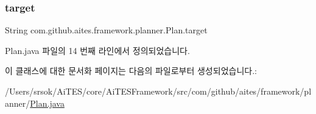 \subsubsection{\texorpdfstring{target}{target}}
{\footnotesize\ttfamily String com.\+github.\+aites.\+framework.\+planner.\+Plan.\+target\hspace{0.3cm}{\ttfamily [private]}}



Plan.\+java 파일의 14 번째 라인에서 정의되었습니다.



이 클래스에 대한 문서화 페이지는 다음의 파일로부터 생성되었습니다.\+:\begin{DoxyCompactItemize}
\item 
/\+Users/srsok/\+Ai\+T\+E\+S/core/\+Ai\+T\+E\+S\+Framework/src/com/github/aites/framework/planner/\mbox{\hyperlink{_plan_8java}{Plan.\+java}}\end{DoxyCompactItemize}
